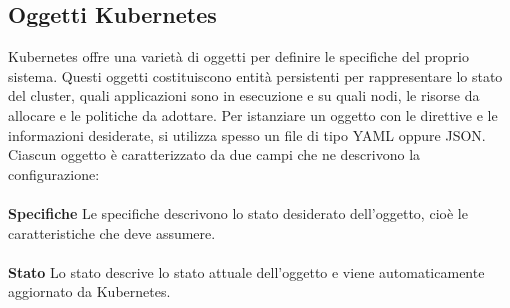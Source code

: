 \subsection{Oggetti Kubernetes}
Kubernetes offre una varietà di oggetti per definire le specifiche del proprio sistema. Questi oggetti costituiscono entità persistenti per rappresentare lo stato del cluster, quali applicazioni sono in esecuzione e su quali nodi, le risorse da allocare e le politiche da adottare. Per istanziare un oggetto con le direttive e le informazioni desiderate, si utilizza spesso un file di tipo YAML oppure JSON.
Ciascun oggetto è caratterizzato da due campi che ne descrivono la configurazione: \\\\
\textbf{Specifiche} Le specifiche descrivono lo stato desiderato dell'oggetto, cioè le caratteristiche che deve assumere. \\\\
\textbf{Stato} Lo stato descrive lo stato attuale dell'oggetto e viene automaticamente aggiornato da Kubernetes.
